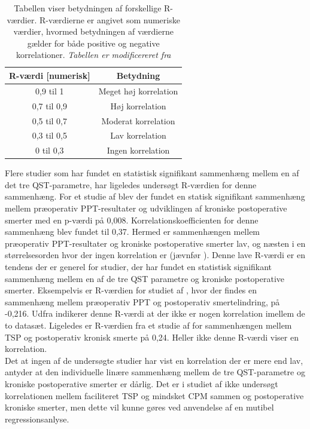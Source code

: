 \begin{table}[H]
\centering
\begin{tabular}{cc}
\rowcolor[HTML]{C0C0C0} 
R-værdi {[}numerisk{]} & Betydning  \\ \hline
0,9 til 1              & Meget høj korrelation              \\
0,7 til 0,9            & Høj korrelation                    \\
0,5 til 0,7            & Moderat korrelation                \\
0,3 til 0,5            & Lav korrelation                    \\
0 til 0,3              & Ingen korrelation                  \\ \hline
\end{tabular}
\caption{Tabellen viser betydningen af forskellige R-værdier. R-værdierne er angivet som numeriske værdier, hvormed betydningen af værdierne gælder for både positive og negative korrelationer. \textit{Tabellen er modificereret fra }}
\label{tab:styrke_r}
\end{table}

Flere studier som har fundet en statistisk signifikant sammenhæng mellem en af det tre QST-parametre, har ligeledes undersøgt R-værdien for denne sammenhæng. For et studie af  blev der fundet en statisk signifikant sammenhæng mellem præoperativ PPT-resultater og udviklingen af kroniske postoperative smerter med en p-værdi på 0,008. Korrelationskoefficienten for denne sammenhæng blev fundet til 0,37. Hermed er sammenhængen mellem præoperativ PPT-resultater og kroniske postoperative smerter lav, og næsten i en størrelsesorden hvor der ingen korrelation er (jævnfør ). Denne lave R-værdi er en tendens der er generel for studier, der har fundet en statistisk signifikant sammenhæng mellem en af de tre QST parametre og kroniske postoperative smerter. Eksempelvis er R-værdien for studiet af , hvor der findes en sammenhæng mellem præoperativ PPT og postoperativ smertelindring, på -0,216. Udfra  indikerer denne R-værdi at der ikke er nogen korrelation imellem de to datasæt. Ligeledes er R-værdien fra et studie af  for sammenhængen mellem TSP og postoperativ kronisk smerte på 0,24. Heller ikke denne R-værdi viser en korrelation. \\
Det at ingen af de undersøgte studier har vist en korrelation der er mere end lav, antyder at den individuelle linære sammenhæng mellem de tre QST-parametre og kroniske postoperative smerter er dårlig. Det er i studiet af  ikke undersøgt korrelationen mellem faciliteret TSP og mindsket CPM sammen og postoperative kroniske smerter, men dette vil kunne gøres ved anvendelse af en mutibel regressionsanlyse.  

